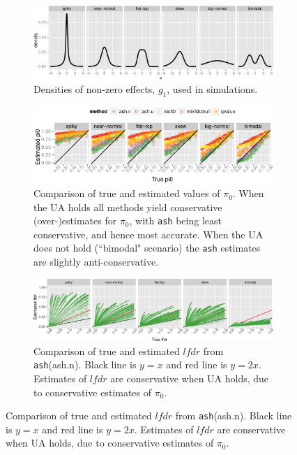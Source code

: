 \documentclass[11pt]{article}
\def\lfdr{\textit{lfdr}}
\def\ash{{\tt ash}\xspace}
\begin{document}
\begin{figure} 
\begin{center}
\begin{subfigure}{\textwidth}
	\includegraphics[width=\textwidth]{../analysis/figure/plot_egdens.Rmd/scenario_density-1.pdf} 
	\caption{Densities of non-zero effects, $g_1$, used in simulations.} \label{fig:altdens}
\end{subfigure}
\begin{subfigure}{\textwidth}
\includegraphics[width=\textwidth]{../analysis/figure/plot_pi0est.Rmd/plot_pi0est-1.pdf} 
\caption{Comparison of true and estimated values of $\pi_0$. When the UA holds all methods yield conservative (over-)estimates for $\pi_0$, with \ash being least conservative, and hence most accurate. When the UA does not hold (``bimodal" scenario) the \ash estimates are slightly anti-conservative.} \label{fig:pi0sims}
\end{subfigure}
\begin{subfigure}{\textwidth}
\includegraphics[width=\textwidth]{../analysis/figure/plot_lfsr.Rmd/plot_lfdr-1.png} 
\caption{Comparison of true and estimated $\lfdr$ from \ash (ash.n). Black line is $y=x$ and red line is $y=2x$. Estimates of $\lfdr$ are conservative when UA holds, due to conservative estimates of $\pi_0$.} \label{fig:lfdr}
\end{subfigure}

\end{center}
\end{figure}
\end{document}
